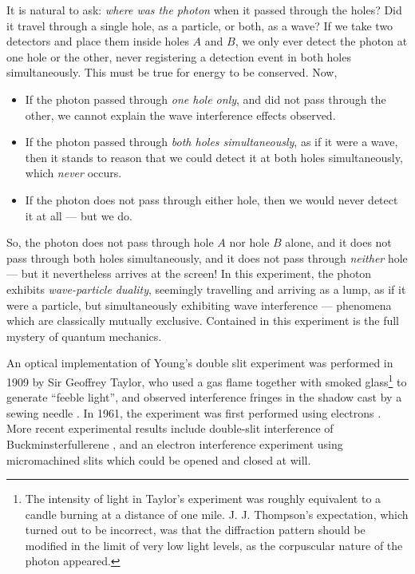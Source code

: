 It is natural to ask: \emph{where was the photon} when it passed through the holes? Did it travel through a single hole, as a particle, or both, as a wave? If we take two detectors and place them inside holes $A$ and $B$, we only ever detect the photon at one hole or the other, never registering a detection event in both holes simultaneously. This must be true for energy to be conserved. 
Now,
\begin{itemize}
    \item If the photon passed through \emph{one hole only}, and did not pass through the other, we cannot explain the wave interference effects observed.
    \item If the photon passed through \emph{both holes simultaneously}, as if it were a wave, then it stands to reason that we could detect it at both holes simultaneously,  which \emph{never} occurs.
    \item If the photon does not pass through either hole, then we would never detect it at all --- but we do.
\end{itemize}
So, the photon does not pass through hole $A$ nor hole $B$ alone, and it does not pass through both holes simultaneously, and it does not pass through \emph{neither} hole --- but it nevertheless arrives at the screen! In this experiment, the photon exhibits \emph{wave-particle duality}, seemingly travelling and arriving as a lump, as if it were a particle, but simultaneously exhibiting wave interference --- phenomena which are classically mutually exclusive.  Contained in this experiment is the full mystery of quantum mechanics.

An optical implementation of Young's double slit experiment was performed in 1909 by Sir Geoffrey Taylor, who used a gas flame together with smoked glass\footnote{The intensity of light in Taylor's experiment was roughly equivalent to a candle burning at a distance of one mile. J. J. Thompson's expectation, which turned out to be incorrect, was that the diffraction pattern should be modified in the limit of very low light levels, as the corpuscular nature of the photon appeared.}
to generate ``feeble light'', and observed interference fringes in the shadow cast by a sewing needle \cite{Taylor1909}. In 1961, the experiment was first performed using electrons \cite{Jonsson1974}. More recent experimental results include double-slit interference of Buckminsterfullerene \cite{Arndt1999}, and an electron interference experiment using micromachined slits \cite{Bach2013} which could be opened and closed at will.

